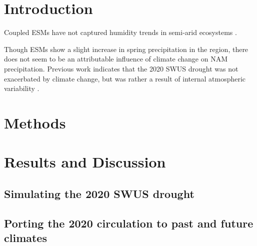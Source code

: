 \documentclass[draft]{agujournal2019}
\begin{document}
%
%


\section{Introduction}



Coupled ESMs have not captured humidity trends in semi-arid ecosystems \cite{simpson2024}.

Though ESMs show a slight increase in spring precipitation in the region, there does not seem to be an attributable influence of climate change on NAM precipitation. Previous work indicates that the 2020 SWUS drought was not exacerbated by climate change, but was rather a result of  internal atmospheric variability \cite{seager2022}. 

\section{Methods}

\section{Results and Discussion}
\subsection{Simulating the 2020 SWUS drought}

\subsection{Porting the 2020 circulation to past and future climates}
\end{document}
